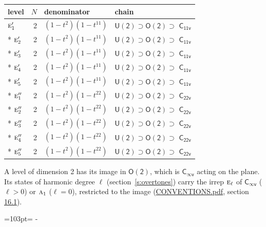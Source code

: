 \documentclass[10pt,a4paper]{article}
\newcommand{\needspace}[1]{\par\penalty-100\begingroup\dimen0=#1\relax\dimen2=\pagegoal
  \advance\dimen2-\pagetotal\ifdim\dimen0>\dimen2\relax\ifdim\dimen2>0pt\vfil\break\fi\fi
  \endgroup}
\numberwithin{equation}{section}
\newcommand{\grp}[1]{\mathsf{#1}}
\newcommand{\irr}[1]{\text{\normalfont\scshape #1}}
\begin{document}
{\small\begin{longtable}{@{}lrll@{}}\toprule
level & $N$ & denominator & chain\\\midrule\endhead
\bottomrule\endfoot\endlastfoot
$\irr{e}_{1}'$ & 2 & $(1-t^{2})(1-t^{11})$ & $\grp{U(2)} \supset \grp{O(2)} \supset$ \href{C11v.pdf}{$\grp{C_{11v}}$}\\*
$\irr{e}_{2}'$ & 2 & $(1-t^{2})(1-t^{11})$ & $\grp{U(2)} \supset \grp{O(2)} \supset$ \href{C11v.pdf}{$\grp{C_{11v}}$}\\*
$\irr{e}_{3}'$ & 2 & $(1-t^{2})(1-t^{11})$ & $\grp{U(2)} \supset \grp{O(2)} \supset$ \href{C11v.pdf}{$\grp{C_{11v}}$}\\*
$\irr{e}_{4}'$ & 2 & $(1-t^{2})(1-t^{11})$ & $\grp{U(2)} \supset \grp{O(2)} \supset$ \href{C11v.pdf}{$\grp{C_{11v}}$}\\*
$\irr{e}_{5}'$ & 2 & $(1-t^{2})(1-t^{11})$ & $\grp{U(2)} \supset \grp{O(2)} \supset$ \href{C11v.pdf}{$\grp{C_{11v}}$}\\*
$\irr{e}_{1}''$ & 2 & $(1-t^{2})(1-t^{22})$ & $\grp{U(2)} \supset \grp{O(2)} \supset$ $\grp{C_{22v}}$\\*
$\irr{e}_{2}''$ & 2 & $(1-t^{2})(1-t^{22})$ & $\grp{U(2)} \supset \grp{O(2)} \supset$ $\grp{C_{22v}}$\\*
$\irr{e}_{3}''$ & 2 & $(1-t^{2})(1-t^{22})$ & $\grp{U(2)} \supset \grp{O(2)} \supset$ $\grp{C_{22v}}$\\*
$\irr{e}_{4}''$ & 2 & $(1-t^{2})(1-t^{22})$ & $\grp{U(2)} \supset \grp{O(2)} \supset$ $\grp{C_{22v}}$\\*
$\irr{e}_{5}''$ & 2 & $(1-t^{2})(1-t^{22})$ & $\grp{U(2)} \supset \grp{O(2)} \supset$ $\grp{C_{22v}}$\\
\bottomrule\end{longtable}}
A level of dimension 2 has its image in $\grp{O(2)}$, which is \href{Cinfv.pdf}{$\grp{C_{\infty v}}$} acting on the plane. \label{n:index.harmonic.degree}Its states of harmonic degree $\ell$ (section~\ref{s:overtones}) carry the irrep $\irr{e}_{\ell}$ of \href{Cinfv.pdf}{$\grp{C_{\infty v}}$} ($\ell > 0$) or $\irr{a}_{1}$ ($\ell = 0$), restricted to the image (\href{../../CONVENTIONS.pdf}{CONVENTIONS.pdf}, section \href{../../CONVENTIONS.pdf\#conv.16.1}{16.1}).
\needspace{103pt}
\end{document}
